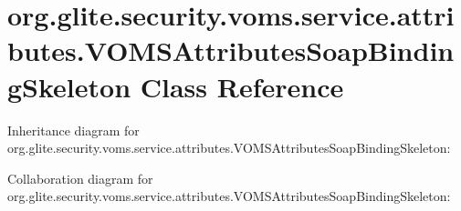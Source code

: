 \hypertarget{classorg_1_1glite_1_1security_1_1voms_1_1service_1_1attributes_1_1VOMSAttributesSoapBindingSkeleton}{
\section{org.glite.security.voms.service.attributes.VOMSAttributesSoapBindingSkeleton Class Reference}
\label{classorg_1_1glite_1_1security_1_1voms_1_1service_1_1attributes_1_1VOMSAttributesSoapBindingSkeleton}
}


Inheritance diagram for org.glite.security.voms.service.attributes.VOMSAttributesSoapBindingSkeleton:


Collaboration diagram for org.glite.security.voms.service.attributes.VOMSAttributesSoapBindingSkeleton:
